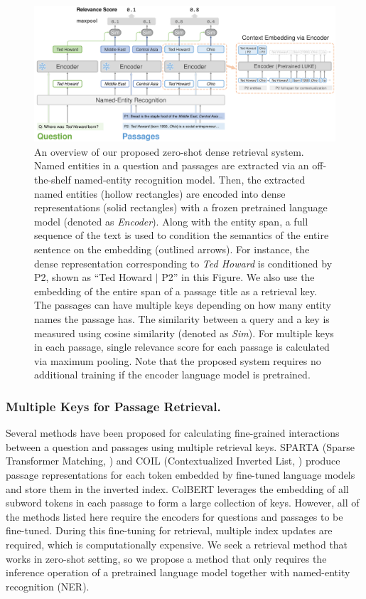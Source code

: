 \documentclass[letterpaper]{article} %
\begin{document}
\begin{figure}[t]
	\centering
	\includegraphics[width=1\textwidth]{figures/overview.pdf}
	\caption{
		An overview of our proposed zero-shot dense retrieval system.
		Named entities in a question and passages are extracted via an off-the-shelf named-entity recognition model.
		Then, the extracted named entities (hollow rectangles) are encoded into dense representations (solid rectangles) with a frozen pretrained language model (denoted as \textit{Encoder}).
		Along with the entity span, a full sequence of the text is used to condition the semantics of the entire sentence on the embedding (outlined arrows).
		For instance, the dense representation corresponding to \textit{Ted Howard} is conditioned by P2, shown as ``Ted Howard $\mid$ P2'' in this Figure.
		We also use the embedding of the entire span of a passage title as a retrieval key.
		The passages can have multiple keys depending on how many entity names the passage has.
		The similarity between a query and a key is measured using cosine similarity (denoted as \textit{Sim}).
		For multiple keys in each passage, single relevance score for each passage is calculated via maximum pooling.
		Note that the proposed system requires no additional training if the encoder language model is pretrained.
	}
	\label{fig:overview}
\end{figure}


\subsubsection{Multiple Keys for Passage Retrieval.}
Several methods have been proposed for calculating fine-grained interactions between a question and passages using multiple retrieval keys.
SPARTA (Sparse Transformer Matching, \citep{zhao-etal-2021-sparta}) and COIL (Contextualized Inverted List, \citep{gao-etal-2021-coil}) produce passage representations for each token embedded by fine-tuned language models and store them in the inverted index.
ColBERT \citep{khattab-etal-2021-relevance} leverages the embedding of all subword tokens in each passage to form a large collection of keys.
However, all of the methods listed here require the encoders for questions and passages to be fine-tuned.
During this fine-tuning for retrieval, multiple index updates are required, which is computationally expensive.
We seek a retrieval method that works in zero-shot setting, so we propose a method that only requires the inference operation of a pretrained language model together with named-entity recognition (NER).
\end{document}
